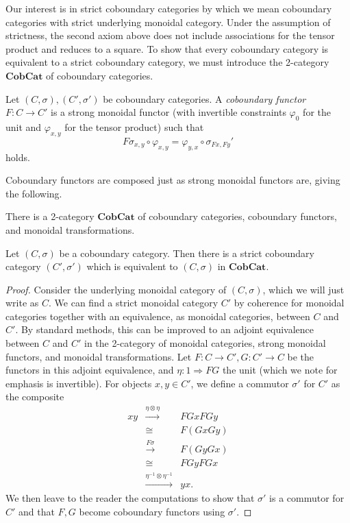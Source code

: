 \documentclass{amsbook} %
\newcommand{\mb}{\mathbf}
\numberwithin{section}{chapter}
\begin{document}
Our interest is in strict coboundary categories by which we mean coboundary categories with strict underlying monoidal category.  Under the assumption of strictness, the second axiom above does not include associations for the tensor product and reduces to a square.  To show that every coboundary category is equivalent to a strict coboundary category, we must introduce the 2-category $\mb{CobCat}$ of coboundary categories.

\begin{Defi}
Let $(C,\sigma), (C', \sigma')$ be coboundary categories.  A \emph{coboundary functor} $F:C \rightarrow C'$ is a strong monoidal functor (with invertible constraints $\varphi_{0}$ for the unit and $\varphi_{x,y}$ for the tensor product) such that
\[
F\sigma_{x,y} \circ \varphi_{x,y} = \varphi_{y,x} \circ \sigma_{Fx,Fy}'
\]
holds.
\end{Defi}

Coboundary functors are composed just as strong monoidal functors are, giving the following.

\begin{lem}
There is a 2-category $\mb{CobCat}$  of coboundary categories, coboundary functors, and monoidal transformations.
\end{lem}


\begin{prop}
Let $(C, \sigma)$ be a coboundary category.  Then there is a strict coboundary category $(C', \sigma')$ which is equivalent to $(C, \sigma)$ in $\mb{CobCat}$.
\end{prop}
\begin{proof}
Consider the underlying monoidal category of $(C, \sigma)$, which we will just write as $C$.  We can find a strict monoidal category $C'$ by coherence for monoidal categories together with an equivalence, as monoidal categories, between $C$ and $C'$.  By standard methods, this can be improved to an adjoint equivalence between $C$ and $C'$ in the 2-category of monoidal categories, strong monoidal functors, and monoidal transformations.  Let $F: C \rightarrow C', G:C' \rightarrow C$ be the functors in this adjoint equivalence, and $\eta: 1 \Rightarrow FG$ the unit (which we note for emphasis is invertible).  For objects $x,y \in C'$, we define a commutor $\sigma'$ for $C'$ as the composite
\[
\begin{array}{rcl}
xy & \stackrel{\eta \otimes \eta}{\longrightarrow} & FGxFGy \\
& \cong & F(GxGy) \\
& \stackrel{F\sigma}{\longrightarrow} & F(GyGx) \\
& \cong  & FGyFGx \\
& \stackrel{\eta^{-1} \otimes \eta^{-1}}{\longrightarrow} & yx.
\end{array}
\]
We then leave to the reader the computations to show that $\sigma'$ is a commutor for $C'$ and that $F,G$ become coboundary functors using $\sigma'$.
\end{proof}
\end{document}
